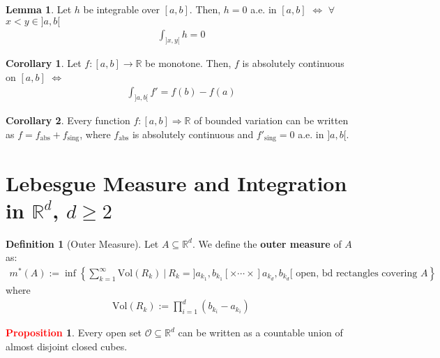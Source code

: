 \documentclass[reqno,11pt]{amsart}
\theoremstyle{definition}
\newcommand{\rd}[0]{\mathbb{R}^d}
\newcommand{\bb}[1]{\mathbb{#1}}
\newcommand{\sets}[2]{ \left\{ #1\ |\ #2 \right\}}
\newtheorem{corollary}{Corollary}
\newtheorem{lemma}[theorem]{Lemma}
\theoremstyle{definition}
\newtheorem{definition}{\textcolor{OliveGreen}{Definition}}
\newtheorem{prop}{\textcolor{red}{Proposition}}
\theoremstyle{remark}
\begin{document}
\begin{lemma}
	Let $h$ be integrable over $[a,b]$. Then, $h=0$ a.e. in $[a,b]$ $\iff$ $\forall$ $x < y \in ]a,b[$
	\begin{align*}
		\int_{]x,y[} h = 0 	
	\end{align*}
\end{lemma}

\begin{corollary}
	Let $f: [a,b] \rightarrow \bb{R}$ be monotone. Then, $f$ is absolutely continuous on $[a,b]$ $\iff$ 
\begin{align*}
	\int_{]a,b[} f' = f(b) - f(a) 	
\end{align*}
\end{corollary}

\begin{corollary}
	Every function $f : [a,b] \Rightarrow \bb{R}$ of bounded variation can be written as $f = f_{\mbox{abs}} + f_{\mbox{sing}}$, where $f_{\mbox{abs}}$ is absolutely continuous and $ f'_{\mbox{sing}} = 0$ a.e. in $]a, b[$. 
\end{corollary}

\section{Lebesgue Measure and Integration in $\bb{R}^d$, $d \geq 2$}

\begin{definition}[Outer Measure]
	Let $A \subseteq \rd$. We define the \textbf{outer measure} of $A$ as: 
	\begin{align}
		m^*(A) := \inf \sets{\sum_{k=1}^\infty \mbox{Vol}(R_k)}{R_k = ]a_{k_1}, b_{k_1}[ \times \cdots \times ]a_{k_d}, b_{k_d} [ \mbox{ open, bd rectangles covering } A}
	\end{align}
	where 
	\begin{align*}
		\mbox{Vol}(R_k) := \prod_{i=1}^d (b_{k_i} - a_{k_i} ) 	
	\end{align*}
\end{definition}

\begin{prop}
	Every open set $\mathcal{O} \subseteq \rd$ can be written as a countable union of almost disjoint closed cubes. 
\end{prop}
\end{document}
